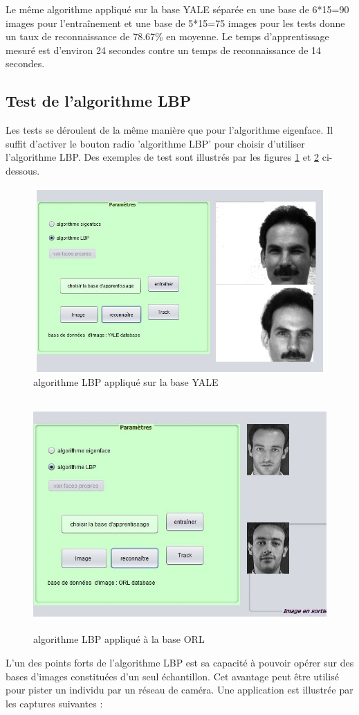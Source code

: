 	Le même algorithme appliqué sur la base YALE séparée en une base de 6*15=90 images pour l'entraînement et une base de 5*15=75 images pour les tests donne un taux de reconnaissance de 78.67\% en moyenne.  Le temps d'apprentissage mesuré est d'environ 24 secondes contre un temps de reconnaissance de 14 secondes. 
	
		\subsection{Test de l'algorithme LBP}
Les tests se déroulent de la même manière que pour l'algorithme eigenface. Il suffit d'activer le bouton radio 'algorithme LBP' pour choisir d'utiliser l'algorithme LBP. Des exemples de test sont illustrés par les figures \ref{fig:reconLBP1} et \ref{fig:reconLBP2} ci-dessous.		
		\begin{figure}[htbp]
			\centering
				\includegraphics[width=350pt,height=200pt]{reconLBP1.JPG}
			\caption{algorithme LBP appliqué sur la base YALE}
			\label{fig:reconLBP1}
		\end{figure}	
		
		\begin{figure}[htbp]
			\centering
				\includegraphics[width=350pt,height=250pt]{reconLBP2.JPG}
			\caption{algorithme LBP appliqué à la base ORL}
			\label{fig:reconLBP2}
		\end{figure}
		\newpage
	L'un des points forts de l'algorithme LBP est sa capacité à pouvoir opérer sur des bases d'images constituées d'un seul échantillon. Cet avantage peut être utilisé pour pister un individu par un réseau de caméra. Une application est illustrée par les captures suivantes :
	
